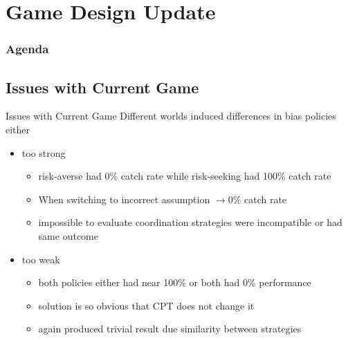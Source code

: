 \documentclass[aspectratio=1610, xcolor=dvipsnames]{packages/beamer}
\newcommand{\displayTOC}{\begin{frame}\frametitle{Agenda} \tableofcontents[currentsection, subsectionstyle=show/show/hide]\end{frame}}
\begin{document}
\section{Game Design Update} \displayTOC

\subsection{Issues with Current Game}
\begin{frame}{Issues with Current Game}
    Different worlds induced differences in bias policies either
    \begin{itemize}
            \item too strong
            \begin{itemize}
                \item risk-averse had 0\% catch rate while risk-seeking had 100\% catch rate
                \item When switching to incorrect assumption $\rightarrow 0$\%  catch rate
                \item impossible to evaluate coordination strategies were incompatible or had same outcome
            \end{itemize}
            \item too weak
            \begin{itemize}
                \item both policies either had near 100\% or both had 0\% performance
                \item solution is so obvious that CPT does not change it
                \item again produced trivial result due similarity between strategies
            \end{itemize}
    \end{itemize}
\end{frame}
\end{document}
